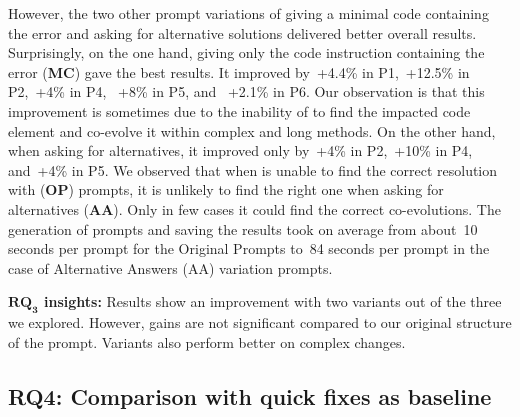 However, the two other prompt variations of giving a minimal code containing the error and asking for alternative solutions delivered better overall results. 
Surprisingly, on the one hand, giving only the code instruction containing the error (\textbf{MC}) gave the best results. It improved by~+4.4\% in P1,~+12.5\% in P2,~+4\% in P4, ~+8\% in P5, and ~+2.1\% in P6. 
Our observation is that this improvement is sometimes due to the inability of \LLM to find the impacted code element and co-evolve it within complex and long methods. 
On the other hand, when asking for alternatives, it improved only by~+4\% in P2,~+10\% in P4, and~+4\% in P5. We observed that when \LLM is unable to find the correct resolution with (\textbf{OP}) prompts, it is unlikely to find the right one when asking for alternatives (\textbf{AA}). Only in few cases it could find the correct co-evolutions.  %
The generation of prompts and saving the results took on average from about~10 seconds per prompt for the Original Prompts to~84 seconds per prompt in the case of Alternative Answers (AA) variation prompts.



\begin{tcolorbox}[boxsep=-2pt]
	\textbf{$\boldsymbol{RQ_3}$ insights:}
	Results show an improvement with two variants out of the three we explored. However, gains are not significant compared to our original structure of the prompt. 
	Variants also perform better on complex changes. 
\end{tcolorbox}

\subsection{RQ4: Comparison with quick fixes as baseline}


